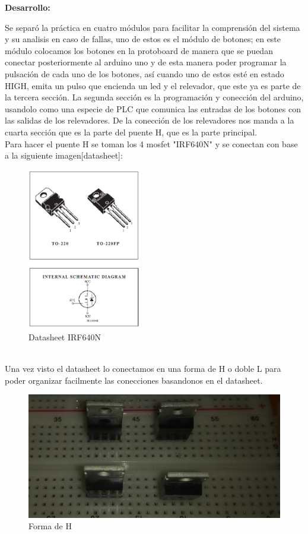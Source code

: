 \documentclass[letterpaper]{article}
\begin{document}
\begin{huge}
\textbf{Desarrollo:}\\
\end{huge}
Se separó la práctica en cuatro módulos para facilitar la comprensión del sistema y su analisis en caso de fallas, uno de estos es el módulo de botones; en este módulo colocamos los botones en la protoboard de manera que se puedan conectar posteriormente al arduino uno y de esta manera poder programar la pulsación de cada uno de los botones, así cuando uno de estos esté en estado HIGH, emita un pulso que encienda un led y el relevador, que este ya es parte de la tercera sección. La segunda sección es la programación y conección del arduino, usandolo como una especie de PLC que comunica las entradas de los botones con las salidas de los relevadores. De la conección de los relevadores nos manda a la cuarta sección que es la parte del puente H, que es la parte principal.
\\
Para hacer el puente H se toman los 4 mosfet "IRF640N" y se conectan con base a la siguiente imagen[datasheet]:\\
\begin{figure}[htbp]
    \centering
    \includegraphics[width=5cm]{Img/datasheetIRF.PNG}
    \caption{Datasheet IRF640N}
    \label{fig:my_lab4el}
\end{figure}\\
Una vez visto el datasheet lo conectamos en una forma de H o doble L para poder organizar facilmente las conecciones basandonos en el datasheet.\\
\newpage
\begin{figure}[htbp]
    \centering
    \includegraphics[width=15cm]{Img/puenteH1.jpeg}
    \caption{Forma de H}
    \label{fig:my_l3abel}
\end{figure}
\end{document}
